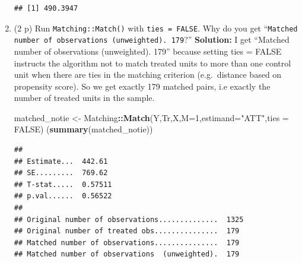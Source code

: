 \documentclass[
]{article}
\newenvironment{Shaded}{\begin{snugshade}}{\end{snugshade}}
\newcommand{\AttributeTok}[1]{\textcolor[rgb]{0.13,0.29,0.53}{#1}}
\newcommand{\ConstantTok}[1]{\textcolor[rgb]{0.56,0.35,0.01}{#1}}
\newcommand{\DecValTok}[1]{\textcolor[rgb]{0.00,0.00,0.81}{#1}}
\newcommand{\FunctionTok}[1]{\textcolor[rgb]{0.13,0.29,0.53}{\textbf{#1}}}
\newcommand{\NormalTok}[1]{#1}
\newcommand{\OtherTok}[1]{\textcolor[rgb]{0.56,0.35,0.01}{#1}}
\newcommand{\SpecialCharTok}[1]{\textcolor[rgb]{0.81,0.36,0.00}{\textbf{#1}}}
\newcommand{\StringTok}[1]{\textcolor[rgb]{0.31,0.60,0.02}{#1}}
\begin{document}
\begin{enumerate}
\begin{verbatim}
## [1] 490.3947
\end{verbatim}
\item
  (2 p) Run \texttt{Matching::Match()} with \texttt{ties = FALSE}. Why
  do you get
  ``\texttt{Matched number of observations (unweighted). 179}?''
  \newline \textbf{Solution:} I get ``Matched number of observations
  (unweighted). 179'' because setting ties = FALSE instructs the
  algorithm not to match treated units to more than one control unit
  when there are ties in the matching criterion (e.g.~distance based on
  propensity score). So we get exactly 179 matched pairs, i.e exactly
  the number of treated units in the sample.

\begin{Shaded}
\begin{Highlighting}[]
\NormalTok{matched\_notie }\OtherTok{\textless{}{-}}\NormalTok{ Matching}\SpecialCharTok{::}\FunctionTok{Match}\NormalTok{(Y,Tr,X,}\AttributeTok{M=}\DecValTok{1}\NormalTok{,}\AttributeTok{estimand=}\StringTok{"ATT"}\NormalTok{,}\AttributeTok{ties =} \ConstantTok{FALSE}\NormalTok{)}
\NormalTok{(}\FunctionTok{summary}\NormalTok{(matched\_notie))}
\end{Highlighting}
\end{Shaded}

\begin{verbatim}
## 
## Estimate...  442.61 
## SE.........  769.62 
## T-stat.....  0.57511 
## p.val......  0.56522 
## 
## Original number of observations..............  1325 
## Original number of treated obs...............  179 
## Matched number of observations...............  179 
## Matched number of observations  (unweighted).  179
\end{verbatim}
\end{enumerate}
\end{document}
